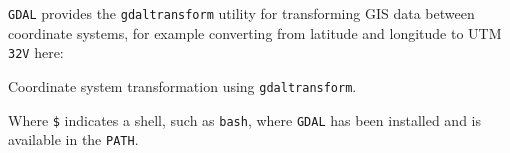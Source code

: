 \texttt{GDAL} provides the \texttt{gdaltransform} utility for transforming GIS data between coordinate systems, for example converting from latitude and longitude to UTM \texttt{32V} here:
%
\begin{listing}[H]
  \caption{Coordinate system transformation using \texttt{gdaltransform}.}
\end{listing}
\noindent
Where \texttt{\$} indicates a shell, such as \texttt{bash}, where \texttt{GDAL} has been installed and is available in the \texttt{PATH}.
